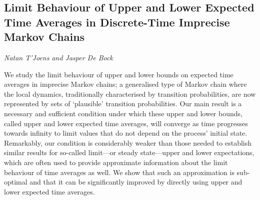 \documentclass[../booklet.tex]{subfiles}
\begin{document}
\subsection[Limit Behaviour of Upper and Lower Expected Time Averages in Discrete-Time Imprecise Markov Chains. {\it Natan T'Joens and Jasper De Bock}]{Limit Behaviour of Upper and Lower Expected Time Averages in Discrete-Time Imprecise Markov Chains}
 

\begin{center}
  {\it Natan T'Joens and Jasper De Bock}
\end{center}



We study the limit behaviour of upper and lower bounds on expected time averages in imprecise Markov chains; a generalised type of Markov chain where the local dynamics, traditionally characterised by transition probabilities, are now represented by sets of `plausible' transition probabilities.
Our main result is a necessary and sufficient condition under which these upper and lower bounds, called upper and lower expected time averages, will converge as time progresses towards infinity to limit values that do not depend on the process' initial state.
Remarkably, our condition is considerably weaker than those needed to establish similar results for so-called limit---or steady state---upper and lower expectations, which are often used to provide approximate information about the limit behaviour of time averages as well.
We show that such an approximation is sub-optimal and that it can be significantly improved by directly using upper and lower expected time averages.

\end{document}
